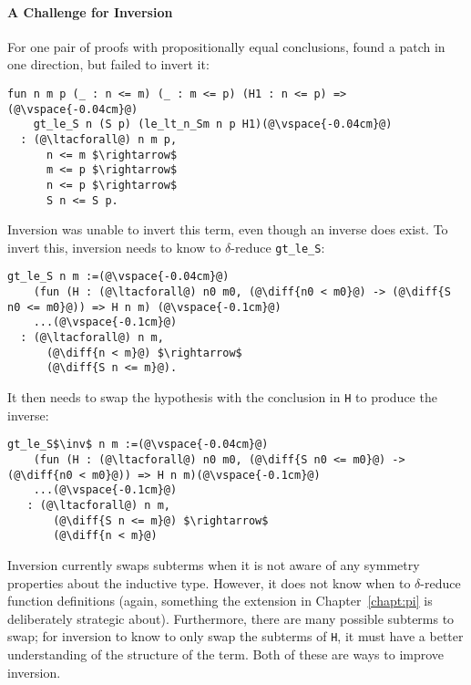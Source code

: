 \paragraph{A Challenge for Inversion} For one pair of proofs with propositionally equal conclusions,
\sysname found a patch in one direction, but failed to invert it:

\begin{lstlisting}[language=coq]
  fun n m p (_ : n <= m) (_ : m <= p) (H1 : n <= p) =>(@\vspace{-0.04cm}@)
    gt_le_S n (S p) (le_lt_n_Sm n p H1)(@\vspace{-0.04cm}@)
  : (@\ltacforall@) n m p,
      n <= m $\rightarrow$
      m <= p $\rightarrow$
      n <= p $\rightarrow$
      S n <= S p.
\end{lstlisting}
Inversion was unable to invert this term, even though an inverse does exist.
To invert this, inversion needs to know to $\delta$-reduce \lstinline{gt_le_S}:

\begin{lstlisting}[language=coq]
  gt_le_S n m :=(@\vspace{-0.04cm}@)
    (fun (H : (@\ltacforall@) n0 m0, (@\diff{n0 < m0}@) -> (@\diff{S n0 <= m0}@)) => H n m) (@\vspace{-0.1cm}@)
    ...(@\vspace{-0.1cm}@)
  : (@\ltacforall@) n m,
      (@\diff{n < m}@) $\rightarrow$
      (@\diff{S n <= m}@).
\end{lstlisting}
It then needs to swap the hypothesis with the conclusion in \lstinline{H} to produce the inverse:

\begin{lstlisting}[language=coq]
  gt_le_S$\inv$ n m :=(@\vspace{-0.04cm}@)
    (fun (H : (@\ltacforall@) n0 m0, (@\diff{S n0 <= m0}@) -> (@\diff{n0 < m0}@)) => H n m)(@\vspace{-0.1cm}@)
    ...(@\vspace{-0.1cm}@)
   : (@\ltacforall@) n m,
       (@\diff{S n <= m}@) $\rightarrow$
       (@\diff{n < m}@)
\end{lstlisting}

Inversion currently swaps subterms when it is not
aware of any symmetry properties about the inductive type. However,
it does not know when to $\delta$-reduce function definitions (again, something the \toolnamec extension in Chapter~\ref{chapt:pi} is deliberately strategic about). Furthermore, 
there are many possible subterms to swap;
for inversion to know to only swap the subterms of \lstinline{H}, it must have a better
understanding of the structure of the term. Both of these are ways to improve inversion.

